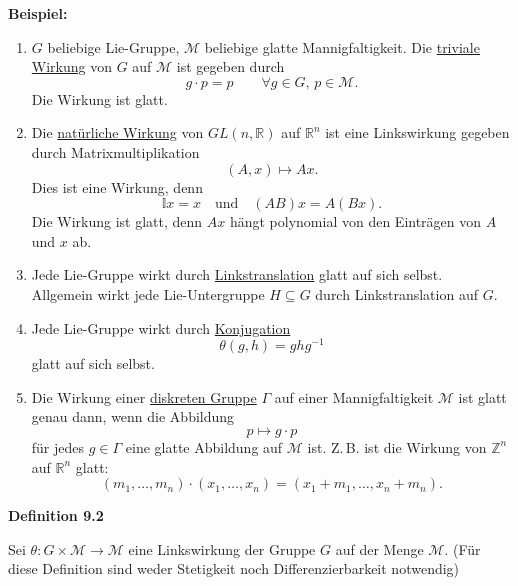\documentclass[fleqn, 12pt, letterpaper]{article}
\begin{document}
\textbf{Beispiel:}
\begin{enumerate}
    \item $G$ beliebige Lie-Gruppe, $\mathcal{M}$ beliebige glatte Mannigfaltigkeit. Die \underline{triviale Wirkung} von $G$ auf $\mathcal{M}$ ist gegeben durch
    \[
        g \cdot p = p \qquad \forall g \in G,\, p \in \mathcal{M}.
    \]
    Die Wirkung ist glatt.

    \item Die \underline{natürliche Wirkung} von $GL(n, \mathbb{R})$ auf $\mathbb{R}^n$ ist eine Linkswirkung gegeben durch Matrixmultiplikation
    \[
        (A, x) \mapsto A x.
    \]
    Dies ist eine Wirkung, denn
    \[
        \mathbb{I} x = x \quad \text{und} \quad (AB)x = A(Bx).
    \]
    Die Wirkung ist glatt, denn $Ax$ hängt polynomial von den Einträgen von $A$ und $x$ ab.

    \item Jede Lie-Gruppe wirkt durch \underline{Linkstranslation} glatt auf sich selbst.\\
    Allgemein wirkt jede Lie-Untergruppe $H \subseteq G$ durch Linkstranslation auf $G$.

    \item Jede Lie-Gruppe wirkt durch \underline{Konjugation}
    \[
        \theta(g, h) = g h g^{-1}
    \]
    glatt auf sich selbst.

    \item Die Wirkung einer \underline{diskreten Gruppe} $\Gamma$ auf einer Mannigfaltigkeit $\mathcal{M}$ ist glatt genau dann, wenn die Abbildung
    \[
        p \mapsto g \cdot p
    \]
    für jedes $g \in \Gamma$ eine glatte Abbildung auf $\mathcal{M}$ ist. Z.\,B. ist die Wirkung von $\mathbb{Z}^n$ auf $\mathbb{R}^n$ glatt:
    \[
        (m_1, \dots, m_n) \cdot (x_1, \dots, x_n) = (x_1 + m_1, \dots, x_n + m_n).
    \]
\end{enumerate}

\textbf{Definition 9.2}

Sei $\theta: G \times \mathcal{M} \to \mathcal{M}$ eine Links\-wirkung der Gruppe $G$ auf der Menge $\mathcal{M}$. (Für diese Definition sind weder Stetigkeit noch Differenzierbarkeit notwendig)
\end{document}
